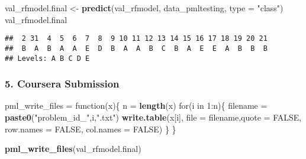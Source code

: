 \documentclass[]{article}
\newenvironment{Shaded}{\begin{snugshade}}{\end{snugshade}}
\newcommand{\KeywordTok}[1]{\textcolor[rgb]{0.13,0.29,0.53}{\textbf{{#1}}}}
\newcommand{\DataTypeTok}[1]{\textcolor[rgb]{0.13,0.29,0.53}{{#1}}}
\newcommand{\DecValTok}[1]{\textcolor[rgb]{0.00,0.00,0.81}{{#1}}}
\newcommand{\StringTok}[1]{\textcolor[rgb]{0.31,0.60,0.02}{{#1}}}
\newcommand{\OtherTok}[1]{\textcolor[rgb]{0.56,0.35,0.01}{{#1}}}
\newcommand{\NormalTok}[1]{{#1}}
\begin{document}
\begin{Shaded}
\begin{Highlighting}[]
\NormalTok{val_rfmodel.final <-}\StringTok{ }\KeywordTok{predict}\NormalTok{(val_rfmodel, data_pmltesting, }\DataTypeTok{type =} \StringTok{"class"}\NormalTok{)}
\NormalTok{val_rfmodel.final}
\end{Highlighting}
\end{Shaded}

\begin{verbatim}
##  2 31  4  5  6  7  8  9 10 11 12 13 14 15 16 17 18 19 20 21 
##  B  A  B  A  A  E  D  B  A  A  B  C  B  A  E  E  A  B  B  B 
## Levels: A B C D E
\end{verbatim}

\subsubsection{5. Coursera Submission}\label{coursera-submission}

\begin{Shaded}
\begin{Highlighting}[]
\NormalTok{pml_write_files =}\StringTok{ }\NormalTok{function(x)\{}
  \NormalTok{n =}\StringTok{ }\KeywordTok{length}\NormalTok{(x)}
  \NormalTok{for(i in }\DecValTok{1}\NormalTok{:n)\{}
    \NormalTok{filename =}\StringTok{ }\KeywordTok{paste0}\NormalTok{(}\StringTok{"problem_id_"}\NormalTok{,i,}\StringTok{".txt"}\NormalTok{)}
    \KeywordTok{write.table}\NormalTok{(x[i], }\DataTypeTok{file =} \NormalTok{filename,}\DataTypeTok{quote =} \OtherTok{FALSE}\NormalTok{, }\DataTypeTok{row.names =} \OtherTok{FALSE}\NormalTok{, }\DataTypeTok{col.names =} \OtherTok{FALSE}\NormalTok{)}
  \NormalTok{\}}
\NormalTok{\}}

\KeywordTok{pml_write_files}\NormalTok{(val_rfmodel.final)}
\end{Highlighting}
\end{Shaded}
\end{document}
